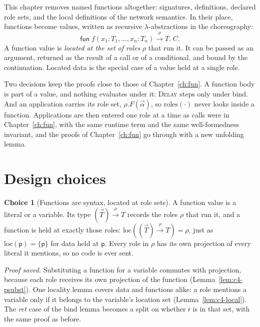 \documentclass[11pt]{report}
\theoremstyle{plain}
\theoremstyle{definition}
\newtheorem{choice}{Choice}[chapter]
\theoremstyle{remark}
\newcommand{\kw}[1]{\mathsf{#1}}
\newcommand{\pp}{\mathsf{p}}
\newcommand{\rr}{\mathsf{r}}
\newcommand{\roles}[1]{\mathrm{roles}(#1)}
\newcommand{\loc}[1]{\mathrm{loc}(#1)}
\newcommand{\farr}[3]{(#1) \xrightarrow{#2} #3}
\newcommand{\cfun}[5]{\kw{fun}\;#1(#2) \xrightarrow{#3} #4.\;#5}
\newcommand{\rn}[1]{{\normalfont\scshape #1}}
\begin{document}
This chapter removes named functions altogether: signatures, definitions,
declared role sets, and the local definitions of the network semantics.  In
their place, functions become values, written as recursive
$\lambda$-abstractions in the choreography:
\[
  \cfun{f}{x_1{:}T_1,\ldots,x_n{:}T_n}{\rho}{T}{C}.
\]
A function value is \emph{located at the set of roles} $\rho$ that run it.  It
can be passed as an argument, returned as the result of a call or of a
conditional, and bound by the continuation.  Located data is the special case
of a value held at a single role.

Two decisions keep the proofs close to those of Chapter~\ref{ch:fun}.  A
function body is part of a value, and nothing evaluates under it: \rn{Delay}
steps only under bind.  And an application carries its role set,
$\rho.F(\vec\alpha)$, so $\roles{\cdot}$ never looks inside a function.
Applications are then entered one role at a time as calls were in
Chapter~\ref{ch:fun}, with the same runtime term and the same
well-formedness invariant, and the proofs of Chapter~\ref{ch:fun} go through
with a new unfolding lemma.

\section{Design choices}
\label{sec:c4-choices}

\begin{choice}[Functions are syntax, located at role sets]\label{cho:c4-located}
  A function value is a literal or a variable.  Its type
  $\farr{\vec T}{\rho}{T}$ records the roles $\rho$ that run it, and a function
  is held at exactly those roles: $\loc{\farr{\vec T}{\rho}{T}}=\rho$, just as
  $\loc{\pp}=\{\pp\}$ for data held at $\pp$.  Every role in $\rho$ has its
  own projection of every literal it mentions, so no code is ever sent.

  \emph{Proof saved.}  Substituting a function for a variable commutes with
  projection, because each role receives its own projection of the function
  (Lemma~\ref{lem:c4-psubst}).  One locality lemma covers data and functions
  alike: a role mentions a variable only if it belongs to the variable's
  location set (Lemma~\ref{lem:c4-local}).  The \emph{ret} case of the bind
  lemma becomes a split on whether $\rr$ is in that set, with the same proof
  as before.
\end{choice}
\end{document}
